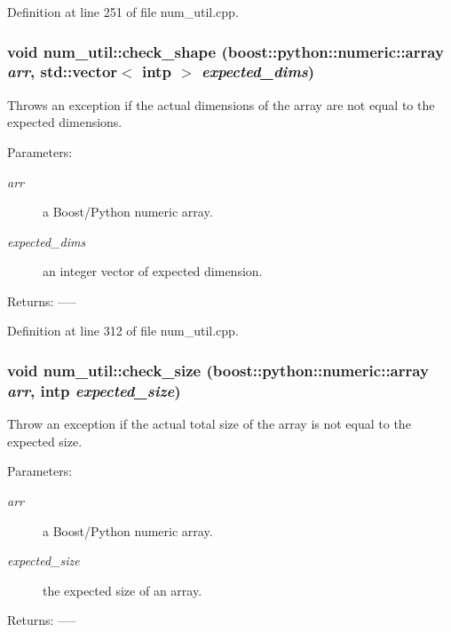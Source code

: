 Definition at line 251 of file num\_\-util.cpp.
\subsubsection{\setlength{\rightskip}{0pt plus 5cm}void num\_\-util::check\_\-shape (boost::python::numeric::array {\em arr}, std::vector$<$ intp $>$ {\em expected\_\-dims})}\label{namespacenum__util_a44}


Throws an exception if the actual dimensions of the array are not equal to the expected dimensions. \begin{Desc}
\item[Parameters:]
\begin{description}
\item[{\em arr}]a Boost/Python numeric array. \item[{\em expected\_\-dims}]an integer vector of expected dimension. \end{description}
\end{Desc}
\begin{Desc}
\item[Returns:]-----\end{Desc}


Definition at line 312 of file num\_\-util.cpp.
\subsubsection{\setlength{\rightskip}{0pt plus 5cm}void num\_\-util::check\_\-size (boost::python::numeric::array {\em arr}, intp {\em expected\_\-size})}\label{namespacenum__util_a41}


Throw an exception if the actual total size of the array is not equal to the expected size. \begin{Desc}
\item[Parameters:]
\begin{description}
\item[{\em arr}]a Boost/Python numeric array. \item[{\em expected\_\-size}]the expected size of an array. \end{description}
\end{Desc}
\begin{Desc}
\item[Returns:]-----\end{Desc}


